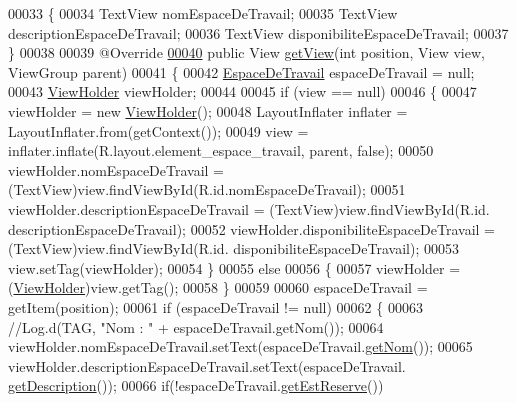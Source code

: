 \begin{DoxyCode}
00033     \{
00034         TextView nomEspaceDeTravail;
00035         TextView descriptionEspaceDeTravail;
00036         TextView disponibiliteEspaceDeTravail;
00037     \}
00038 
00039     @Override
\hyperlink{classcom_1_1lasalle_1_1meeting_1_1_espace_de_travail_adaptateur_a288239cdb1a4e23274361c4a5dc503ba}{00040}     \textcolor{keyword}{public} View \hyperlink{classcom_1_1lasalle_1_1meeting_1_1_espace_de_travail_adaptateur_a288239cdb1a4e23274361c4a5dc503ba}{getView}(\textcolor{keywordtype}{int} position, View view, ViewGroup parent)
00041     \{
00042         \hyperlink{classcom_1_1lasalle_1_1meeting_1_1_espace_de_travail}{EspaceDeTravail} espaceDeTravail = null;
00043         \hyperlink{classcom_1_1lasalle_1_1meeting_1_1_espace_de_travail_adaptateur_1_1_view_holder}{ViewHolder} viewHolder;
00044 
00045         \textcolor{keywordflow}{if} (view == null)
00046         \{
00047             viewHolder = \textcolor{keyword}{new} \hyperlink{classcom_1_1lasalle_1_1meeting_1_1_espace_de_travail_adaptateur_1_1_view_holder}{ViewHolder}();
00048             LayoutInflater inflater = LayoutInflater.from(getContext());
00049             view = inflater.inflate(R.layout.element\_espace\_travail, parent, \textcolor{keyword}{false});
00050             viewHolder.nomEspaceDeTravail = (TextView)view.findViewById(R.id.nomEspaceDeTravail);
00051             viewHolder.descriptionEspaceDeTravail = (TextView)view.findViewById(R.id.
      descriptionEspaceDeTravail);
00052             viewHolder.disponibiliteEspaceDeTravail = (TextView)view.findViewById(R.id.
      disponibiliteEspaceDeTravail);
00053             view.setTag(viewHolder);
00054         \}
00055         \textcolor{keywordflow}{else}
00056         \{
00057             viewHolder = (\hyperlink{classcom_1_1lasalle_1_1meeting_1_1_espace_de_travail_adaptateur_1_1_view_holder}{ViewHolder})view.getTag();
00058         \}
00059 
00060         espaceDeTravail = getItem(position);
00061         \textcolor{keywordflow}{if} (espaceDeTravail != null)
00062         \{
00063             \textcolor{comment}{//Log.d(TAG, "Nom : " + espaceDeTravail.getNom());}
00064             viewHolder.nomEspaceDeTravail.setText(espaceDeTravail.\hyperlink{classcom_1_1lasalle_1_1meeting_1_1_espace_de_travail_ae662e2674616a8548755cb64a38e0432}{getNom}());
00065             viewHolder.descriptionEspaceDeTravail.setText(espaceDeTravail.
      \hyperlink{classcom_1_1lasalle_1_1meeting_1_1_espace_de_travail_a815ecee3f01117f2d9b1d9441b214907}{getDescription}());
00066             \textcolor{keywordflow}{if}(!espaceDeTravail.\hyperlink{classcom_1_1lasalle_1_1meeting_1_1_espace_de_travail_a69fe30f8d3aff92986f4c39402e16ab0}{getEstReserve}())

\end{DoxyCode}
